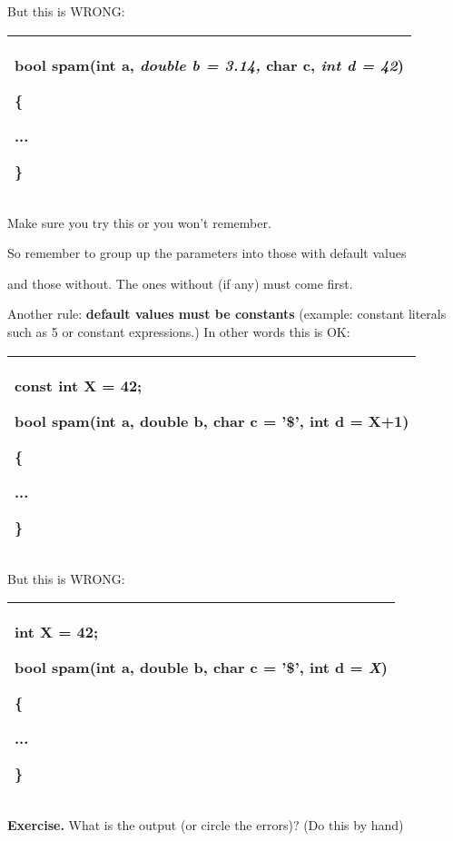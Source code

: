 \documentclass[
]{article}
\begin{document}
But this is WRONG:

\begin{longtable}[]{@{}l@{}}
\toprule
\endhead
\begin{minipage}[t]{0.97\columnwidth}\raggedright
bool spam(int a, \emph{\textbf{double b = 3.14,}} char c,
\emph{\textbf{int d = 42}})

\{

...

\}\strut
\end{minipage}\tabularnewline
\bottomrule
\end{longtable}

Make sure you try this or you won't remember.

So remember to group up the parameters into those with default values

and those without. The ones without (if any) must come first.

Another rule: \textbf{default values must be constants} (example:
constant literals such as 5 or constant expressions.) In other words
this is OK:

\begin{longtable}[]{@{}l@{}}
\toprule
\endhead
\begin{minipage}[t]{0.97\columnwidth}\raggedright
const int X = 42;

bool spam(int a, double b, char c = '\$', int d = X+1)

\{

...

\}\strut
\end{minipage}\tabularnewline
\bottomrule
\end{longtable}

But this is WRONG:

\begin{longtable}[]{@{}l@{}}
\toprule
\endhead
\begin{minipage}[t]{0.97\columnwidth}\raggedright
int X = 42;

bool spam(int a, double b, char c = '\$', int d = \emph{\textbf{X}})

\{

...

\}\strut
\end{minipage}\tabularnewline
\bottomrule
\end{longtable}

\textbf{Exercise.} What is the output (or circle the errors)? (Do this
by hand)
\end{document}
